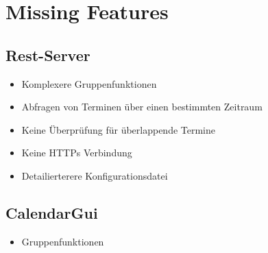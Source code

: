 \documentclass[12pt]{scrartcl}
\begin{document}
    \section{Missing Features}
    \subsection{Rest-Server}
    \begin{itemize}
        \item Komplexere Gruppenfunktionen
        \item Abfragen von Terminen über einen bestimmten Zeitraum 
        \item Keine Überprüfung für überlappende Termine 
        \item Keine HTTPs Verbindung 
        \item Detailierterere Konfigurationsdatei
    \end{itemize}
    \subsection{CalendarGui}
    \begin{itemize}
        \item Gruppenfunktionen
    \end{itemize}

\end{document}
